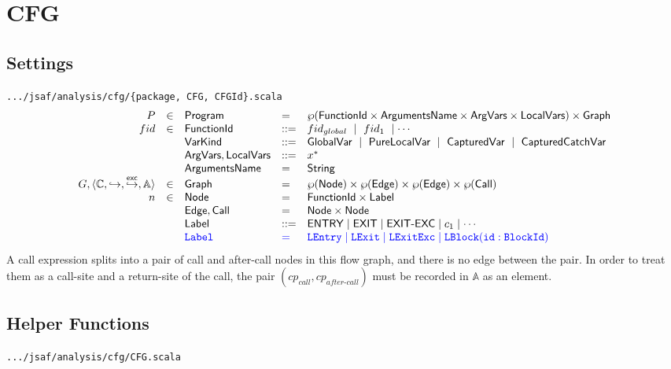 \chapter{CFG}
\section{Settings}
{\inblue\tt .../jsaf/analysis/cfg/\{package, CFG, CFGId\}.scala}\\
\[
\begin{array}{rllll}
P   & \in & \mbox{\textsf{Program}} & = & \wp(\mbox{\textsf{FunctionId}} \times \mbox{\textsf{ArgumentsName}} \times \mbox{\textsf{ArgVars}} \times \mbox{\textsf{LocalVars}}) \times \mbox{\textsf{Graph}} \\
fid & \in & \mbox{\textsf{FunctionId}} & ::= & fid_{global} ~\mid~ fid_1 ~\mid \cdots \\
& & \mbox{\textsf{VarKind}} & ::= & \mbox{\textsf{GlobalVar}} ~\mid~ \mbox{\textsf{PureLocalVar}} ~\mid~ \mbox{\textsf{CapturedVar}} ~\mid~ \mbox{\textsf{CapturedCatchVar}} \\
& & \mbox{\textsf{ArgVars}},\mbox{\textsf{LocalVars}} & ::= & x^* \\
& & \mbox{\textsf{ArgumentsName}} & = & \mbox{\textsf{String}} \\
G, \langle \mathbb{C},\hookrightarrow,\stackrel{\mathsf{exc}}{\hookrightarrow},\mathbb{A}\rangle & \in & \mbox{\textsf{Graph}} & = & \wp(\mbox{\textsf{Node}}) \times \wp(\mbox{\textsf{Edge}}) \times \wp(\mbox{\textsf{Edge}}) \times \wp(\mbox{\textsf{Call}})\\
n & \in & \mbox{\textsf{Node}} & = & \mbox{\textsf{FunctionId}} \times \mbox{\textsf{Label}}\\
& & \mbox{\textsf{Edge}},\mbox{\textsf{Call}} & = & \mbox{\textsf{Node}} \times \mbox{\textsf{Node}}\\
& & \mbox{\textsf{Label}} & ::= & \mbox{\textsf{ENTRY}} \mid \mbox{\textsf{EXIT}} \mid \mbox{\textsf{EXIT-EXC}} \mid c_1 \mid \cdots \\
&&\color{blue}{\tt Label}&\color{blue} = &\color{blue}
{\tt LEntry}\mid {\tt LExit}\mid {\tt LExitExc}\mid {\tt LBlock(id: BlockId)}
\\
\end{array}
\]
  A call expression splits into a pair of call and after-call nodes in this flow graph, and there is no edge between the pair. In order to treat them as a call-site and a return-site of the call, the pair $(cp_{\textit{call}},cp_{\textit{after-call}})$ must be recorded in $\mathbb{A}$ as an element.
\section{Helper Functions}\label{sec:abs-helper}
{\inblue\tt .../jsaf/analysis/cfg/CFG.scala}


